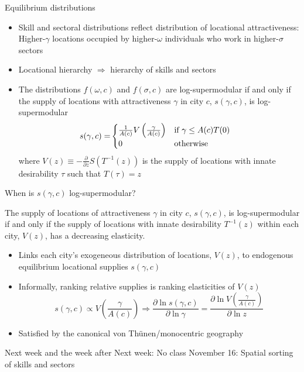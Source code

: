 \documentclass[11pt,notes=hide,aspectratio=169]{beamer}
\begin{document}
\begin{frame}{Equilibrium distributions}
\begin{itemize}
\item Skill and sectoral distributions reflect distribution of locational
attractiveness: Higher-$\gamma$ locations occupied by higher-$\omega$
individuals who work in higher-$\sigma$ sectors
\item Locational hierarchy $\Rightarrow$ hierarchy of skills and sectors
\item The distributions $f(\omega,c)$ and $f(\sigma,c)$ are log-supermodular
if and only if the supply of locations with attractiveness $\gamma$
in city $c$, $s(\gamma,c)$, is log-supermodular 
\begin{align*}
s(\gamma,c)= & \begin{cases}
\frac{1}{A(c)}V\left(\frac{\gamma}{A(c)}\right) & \textnormal{if }\gamma\leq A(c)T(0)\\
0 & \textnormal{otherwise}
\end{cases}
\end{align*}
where\textrm{ $V(z)\equiv-\frac{\partial}{\partial z}S\left(T^{-1}(z)\right)$
is }the supply of locations with innate desirability $\tau$ such
that $T(\tau)=z$
\end{itemize}
\end{frame}
\begin{frame}{When is $s(\gamma,c)$ log-supermodular?}
\begin{proposition}
\label{prop:LocationDistribution}The supply of locations of attractiveness
$\gamma$ in city $c$, $s(\gamma,c)$, is log-supermodular if and
only if the supply of locations with innate desirability \textrm{\textup{$T^{-1}(z)$}}
within each city, $V(z)$, has a decreasing elasticity.\end{proposition}
\begin{itemize}
\item Links each city's exogeneous distribution of locations, $V(z)$, to
endogenous equilibrium locational supplies $s(\gamma,c)$
\item Informally, ranking relative supplies is ranking elasticities of $V(z)$
\[
s(\gamma,c)\propto V\left(\frac{\gamma}{A(c)}\right)\Rightarrow\frac{\partial\ln s(\gamma,c)}{\partial\ln\gamma}=\frac{\partial\ln V\left(\frac{\gamma}{A(c)}\right)}{\partial\ln z}
\]
\item Satisfied by the canonical von Th\"{u}nen/monocentric geography
\end{itemize}
\end{frame}
\begin{frame}{Next week and the week after}
Next week: No class
\bigskip
November 16: Spatial sorting of skills and sectors
\end{frame}
\end{document}
